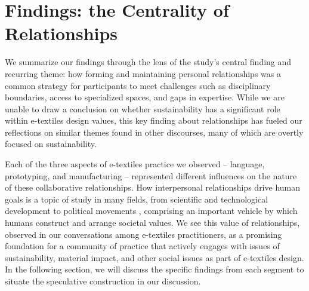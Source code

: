 
\section{Findings: the Centrality of Relationships}

We summarize our findings through the lens of the study's central finding and recurring theme:
how forming and maintaining personal relationships was a common strategy for participants to meet challenges such as disciplinary boundaries, access to specialized spaces, and gaps in expertise. While we are unable to draw a conclusion on whether sustainability has a significant role within e-textiles design values, this key finding about relationships has fueled our reflections on similar themes found in other discourses, many of which are overtly focused on sustainability. 

Each of the three aspects of e-textiles practice we observed -- language, prototyping, and manufacturing -- represented different influences on the nature of these collaborative relationships. How interpersonal relationships drive human goals is a topic of study in many fields, from scientific and technological development \cite{rifat_breaking_2019, steinhardt_breaking_2016, maudet_design_2017, zhang_designing_2019} 
to political movements \cite{hobart_radical_2020, sze_environmental_2020, mcalevey_no_2016}, comprising an important vehicle by which humans construct and arrange societal values. 
We see this value of relationships, observed in our conversations among e-textiles practitioners, as a promising foundation for a community of practice that actively engages with issues of sustainability, material impact, and other social issues as part of e-textiles design. In the following section, we will discuss the specific findings from each segment to situate the speculative construction in our discussion. 


